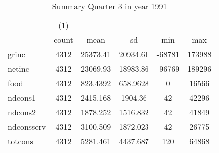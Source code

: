 \begin{table}[htbp]\centering
\def\sym#1{\ifmmode^{#1}\else\(^{#1}\)\fi}
\caption{Summary Quarter 3 in year 1991 \label{sum\_Q3\_y1991}}
\begin{tabular}{l*{1}{ccccc}}
\hline\hline
            &\multicolumn{1}{c}{(1)}&            &            &            &            \\
            &       count&        mean&          sd&         min&         max\\
\hline
grinc       &        4312&    25373.41&    20934.61&      -68781&      173988\\
netinc      &        4312&    23069.93&    18983.86&      -96769&      189296\\
food        &        4312&    823.4392&    658.9628&           0&       16566\\
ndcons1     &        4312&    2415.168&     1904.36&          42&       42296\\
ndcons2     &        4312&    1878.252&    1516.832&          42&       41849\\
ndconsserv  &        4312&    3100.509&    1872.023&          42&       26775\\
totcons     &        4312&    5281.461&    4437.687&         120&       64868\\
\hline\hline
\end{tabular}
\end{table}
